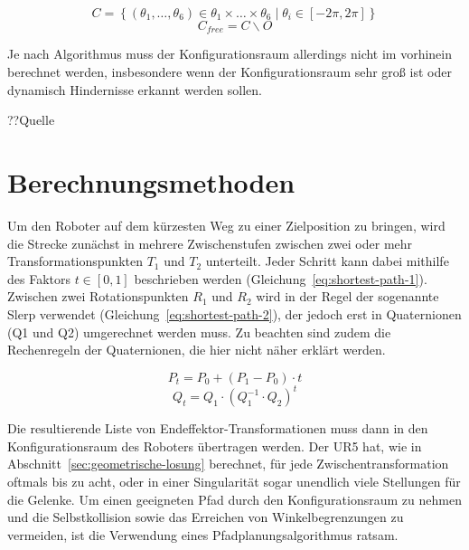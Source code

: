 \begin{equation}
    \mathit{C} = \left\{ \left( \theta_1,\dots,\theta_6 \right) \in \theta_1\times\dots\times\theta_6 \mid \theta_i \in \left[ -2\pi, 2\pi \right]\right\}
    \label{eq:config-1}
\end{equation}
\begin{equation}
    \mathit{C}_{free} = \mathit{C}\backslash\mathit{O}
    \label{eq:config-2}
\end{equation}

Je nach Algorithmus muss der Konfigurationsraum allerdings nicht im vorhinein berechnet werden, insbesondere wenn der Konfigurationsraum sehr groß ist oder dynamisch Hindernisse erkannt werden sollen.

??Quelle


\section{Berechnungsmethoden}\label{sec:berechnungsmethoden}

Um den Roboter auf dem kürzesten Weg zu einer Zielposition zu bringen, wird die Strecke zunächst in mehrere Zwischenstufen zwischen zwei oder mehr Transformationspunkten $T_1$ und $T_2$ unterteilt.
Jeder Schritt kann dabei mithilfe des Faktors $t \in \left[0,1\right]$ beschrieben werden (Gleichung~\ref{eq:shortest-path-1}).
Zwischen zwei Rotationspunkten $R_1$ und $R_2$  wird in der Regel der sogenannte Slerp verwendet  (Gleichung~\ref{eq:shortest-path-2}), der jedoch erst in Quaternionen (Q1 und Q2) umgerechnet werden muss.
Zu beachten sind zudem die Rechenregeln der Quaternionen, die hier nicht näher erklärt werden.

\begin{equation}
    P_{t} = P_0 + \left( P_1 - P_0 \right) \cdot t
    \label{eq:shortest-path-1}
\end{equation}
\begin{equation}
    Q_{t} = Q_1 \cdot \left( Q_1^{-1} \cdot Q_2 \right)^t
    \label{eq:shortest-path-2}
\end{equation}

Die resultierende Liste von Endeffektor-Transformationen muss dann in den Konfigurationsraum des Roboters übertragen werden.
Der UR5 hat, wie in Abschnitt~\ref{sec:geometrische-losung} berechnet, für jede Zwischentransformation oftmals bis zu acht, oder in einer Singularität sogar unendlich viele Stellungen für die Gelenke.
Um einen geeigneten Pfad durch den Konfigurationsraum zu nehmen und die Selbstkollision sowie das Erreichen von Winkelbegrenzungen zu vermeiden, ist die Verwendung eines Pfadplanungsalgorithmus ratsam.

